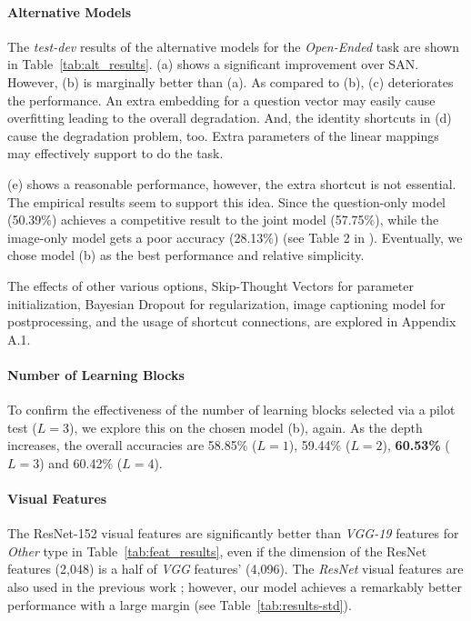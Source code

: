 \documentclass{article}
\begin{document}
\paragraph{Alternative Models} The \textit{test-dev} results of the alternative models for the \textit{Open-Ended} task are shown in Table~\ref{tab:alt_results}. (a) shows a significant improvement over SAN. However, (b) is marginally better than (a). As compared to (b), (c) deteriorates the performance. An extra embedding for a question vector may easily cause overfitting leading to the overall degradation. And, the identity shortcuts in (d) cause the degradation problem, too. Extra parameters of the linear mappings may effectively support to do the task. 

(e) shows a reasonable performance, however, the extra shortcut is not essential. The empirical results seem to support this idea. Since the question-only model (50.39\%) achieves a competitive result to the joint model (57.75\%), while the image-only model gets a poor accuracy (28.13\%) (see Table 2 in \cite{Antol2015}). Eventually, we chose model (b) as the best performance and relative simplicity.

The effects of other various options, Skip-Thought Vectors \cite{Kiros2015} for parameter initialization, Bayesian Dropout \cite{Gal2015} for regularization, image captioning model \cite{Karpathy} for postprocessing, and the usage of shortcut connections, are explored in Appendix A.1. 

\paragraph{Number of Learning Blocks} To confirm the effectiveness of the number of learning blocks selected via a pilot test ($L=3$), we explore this on the chosen model (b), again. As the depth increases, the overall accuracies are 58.85\% ($L=1$), 59.44\% ($L=2$), \textbf{60.53\%} ($L=3$) and 60.42\% ($L=4$).

\paragraph{Visual Features} The ResNet-152 visual features are significantly better than \textit{VGG-19} features for \textit{Other} type in Table~\ref{tab:feat_results}, even if the dimension of the ResNet features (2,048) is a half of \textit{VGG} features' (4,096). The \textit{ResNet} visual features are also used in the previous work \cite{Ilievski2016}; however, our model achieves a remarkably better performance with a large margin (see Table~\ref{tab:results-std}).
\end{document}
